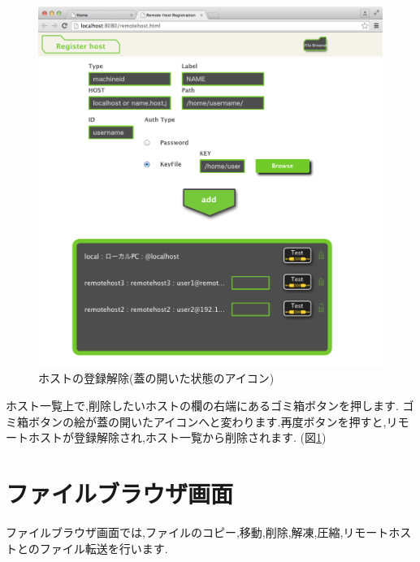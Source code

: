 \documentclass[a4paper,10pt,oneside]{jsbook}
\begin{document}
\begin{figure}[H]
	\begin{center}
		\includegraphics[width=12.0cm]{image/remotehost_002.png}
	\end{center}
	\caption{ホストの登録解除(蓋の開いた状態のアイコン)}
	\label{fig:remotedelete}
\end{figure}


ホスト一覧上で,削除したいホストの欄の右端にあるゴミ箱ボタンを押します.
ゴミ箱ボタンの絵が蓋の開いたアイコンへと変わります.再度ボタンを押すと,リモートホストが登録解除され,ホスト一覧から削除されます.
(図\ref{fig:remotedelete})


\chapter{ファイルブラウザ画面} 
\label{chap:filebrowser}
ファイルブラウザ画面では,ファイルのコピー,移動,削除,解凍,圧縮,リモートホストとのファイル転送を行います.
\end{document}
